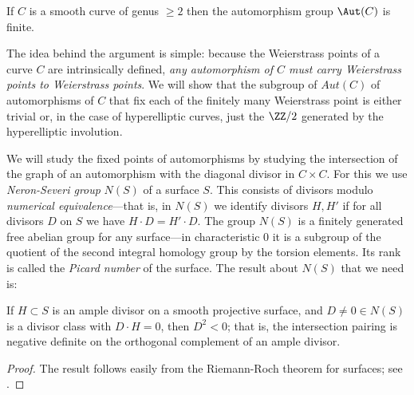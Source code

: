 \begin{theorem}\label{finite autos}
If $C$ is a smooth curve of genus $\geq 2$ then the automorphism group $\Aut(C)$ is finite.
\end{theorem}

  The idea behind the argument is simple: because the Weierstrass points of a curve $C$ are intrinsically defined, \emph{any automorphism of $C$ must carry Weierstrass points to Weierstrass points}. We will show that the subgroup of $Aut(C)$ of automorphisms of $C$ that fix each  of the finitely many Weierstrass point is either
  trivial or, in the case of hyperelliptic curves, just the $\ZZ/2$ generated by the hyperelliptic involution.
    
We will study the fixed points of automorphisms by studying the intersection of the graph of
an automorphism with the diagonal divisor in $C\times C$. For this we use
\emph{Neron-Severi group} $N(S)$ of a surface $S$. This consists of divisors modulo \emph{numerical equivalence}---that is, in $N(S)$ we identify divisors $H, H'$ if for all divisors $D$ on $S$ we have $H\cdot D = H'\cdot D$. The group
$N(S)$ is a  finitely generated free abelian group for any surface---in characteristic 0 it is a subgroup of the quotient of the second integral homology group by the torsion elements. Its rank is called the \emph{Picard number} of the surface. The result about $N(S)$ that we need is:

\begin{theorem}\label{hodge index}
If $H\subset S$ is an ample divisor on a smooth projective surface, and $D \neq 0 \in N(S)$ is a divisor class with $D\cdot H = 0$, then 
$D^2<0$; that is, the intersection pairing is negative definite on the orthogonal complement of an
ample divisor.
\end{theorem}
\begin{proof}
The result follows easily from the Riemann-Roch theorem for surfaces; see \cite[Theorem V.1.9]{Hartshorne1977}.
\end{proof}


